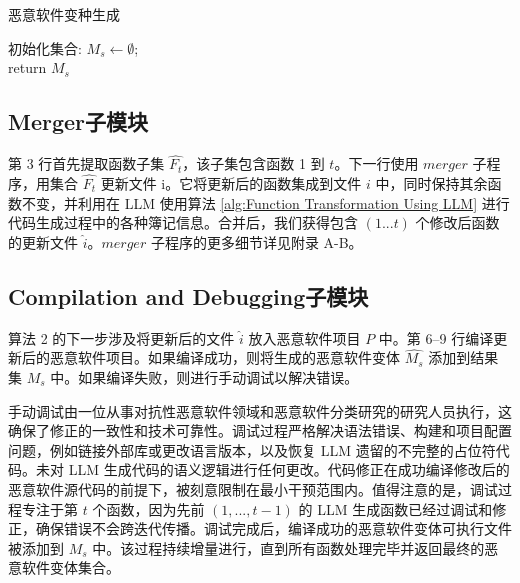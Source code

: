 \begin{algorithm}[htbp]
	\caption{恶意软件变种生成\label{alg:Malware Variant Generation}}
    初始化集合: $M_s \leftarrow \emptyset$;\\
    return $M_{s}$
\end{algorithm}

\subsection{Merger子模块}
第 3 行首先提取函数子集 $\hat{F_{t}}$，该子集包含函数 1 到 $t$。下一行使用 $merger$ 子程序，用集合 $\hat{F_{t}}$ 更新文件 i。它将更新后的函数集成到文件 $i$ 中，同时保持其余函数不变，并利用在 LLM 使用算法 \ref{alg:Function Transformation Using LLM} 进行代码生成过程中的各种簿记信息。合并后，我们获得包含 $(1...t)$ 个修改后函数的更新文件 $\hat{i}$。$merger$ 子程序的更多细节详见附录 A-B。

\subsection{Compilation and Debugging子模块}
算法 2 的下一步涉及将更新后的文件 $\hat{i}$ 放入恶意软件项目 $P$ 中。第 6–9 行编译更新后的恶意软件项目。如果编译成功，则将生成的恶意软件变体 $\hat{M_{s}}$ 添加到结果集 $M_{s}$ 中。如果编译失败，则进行手动调试以解决错误。

手动调试由一位从事对抗性恶意软件领域和恶意软件分类研究的研究人员执行，这确保了修正的一致性和技术可靠性。调试过程严格解决语法错误、构建和项目配置问题，例如链接外部库或更改语言版本，以及恢复 LLM 遗留的不完整的占位符代码。未对 LLM 生成代码的语义逻辑进行任何更改。代码修正在成功编译修改后的恶意软件源代码的前提下，被刻意限制在最小干预范围内。值得注意的是，调试过程专注于第 $t$ 个函数，因为先前 $(1,...,t − 1)$ 的 LLM 生成函数已经过调试和修正，确保错误不会跨迭代传播。调试完成后，编译成功的恶意软件变体可执行文件被添加到 $M_{s}$ 中。该过程持续增量进行，直到所有函数处理完毕并返回最终的恶意软件变体集合。